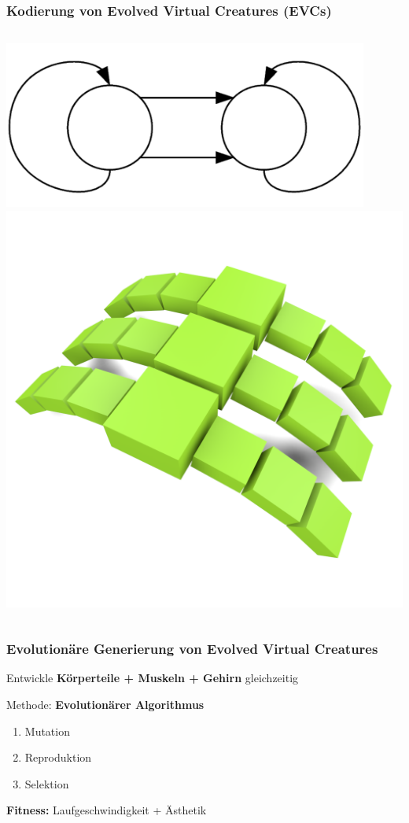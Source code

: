\documentclass{beamer}
\begin{document}
\begin{frame}
	\frametitle{Kodierung von Evolved Virtual Creatures (EVCs)}
	\begin{columns}[c]
		\centering
		\includegraphics[width=0.9\textwidth]{img/g4.png} \pause
		\centering
		\includegraphics[width=\textwidth]{img/4.png}
	\end{columns}
\end{frame}


\begin{frame}
	\frametitle{Evolutionäre Generierung von Evolved Virtual Creatures}
	Entwickle \textbf{Körperteile + Muskeln + Gehirn} gleichzeitig\\ \pause
	\vspace{2em}
	
	Methode: \textbf{Evolutionärer Algorithmus} \pause
	\begin{enumerate}
		\item Mutation
		\item Reproduktion
		\item Selektion
	\end{enumerate}
	\pause
	\vspace{2em}
	\textbf{Fitness:} Laufgeschwindigkeit \pause  + Ästhetik
\end{frame}
\end{document}
